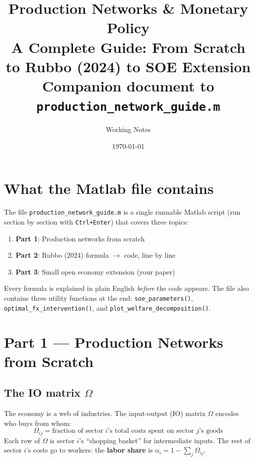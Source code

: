 \documentclass[11pt]{article}
\title{\textbf{Production Networks \& Monetary Policy}\\
\large A Complete Guide: From Scratch to Rubbo (2024) to SOE Extension\\[4pt]
\normalsize Companion document to \texttt{production\_network\_guide.m}}
\author{Working Notes}
\date{\today}
\begin{document}
\maketitle
\tableofcontents
\newpage

\section{What the Matlab file contains}

The file \texttt{production\_network\_guide.m} is a single runnable Matlab script
(run section by section with \texttt{Ctrl+Enter}) that covers three topics:

\begin{enumerate}
  \item \textbf{Part 1}: Production networks from scratch
  \item \textbf{Part 2}: Rubbo (2024) formula $\to$ code, line by line
  \item \textbf{Part 3}: Small open economy extension (your paper)
\end{enumerate}

Every formula is explained in plain English \emph{before} the code appears.
The file also contains three utility functions at the end:
\texttt{soe\_parameters()}, \texttt{optimal\_fx\_intervention()}, and
\texttt{plot\_welfare\_decomposition()}.

\section{Part 1 — Production Networks from Scratch}

\subsection{The IO matrix $\Omega$}

The economy is a web of industries. The input-output (IO) matrix $\Omega$
encodes who buys from whom:
\[
  \Omega_{ij} = \text{fraction of sector } i\text{'s total costs spent on sector } j\text{'s goods}
\]
Each row of $\Omega$ is sector $i$'s ``shopping basket'' for intermediate inputs.
The rest of sector $i$'s costs go to workers: the \textbf{labor share} is
$\alpha_i = 1 - \sum_j \Omega_{ij}$.
\end{document}
